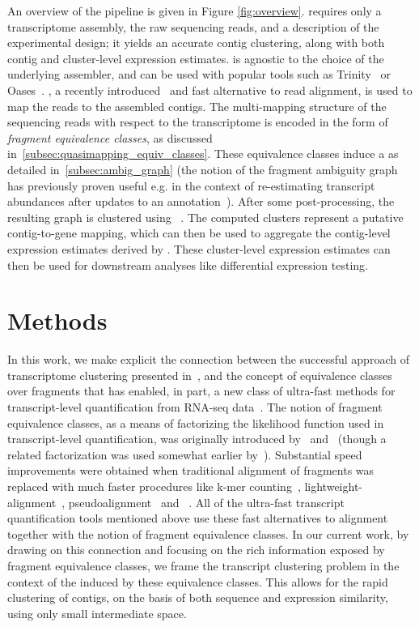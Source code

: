 An overview of the \rapclust pipeline is given in Figure \ref{fig:overview}. \rapclust requires only a transcriptome assembly, the raw sequencing reads, and a description of the experimental design; it yields an accurate contig clustering, along with both contig and cluster-level expression estimates. \rapclust is agnostic to the choice of the underlying \denovo assembler, and can be used with popular tools such as Trinity~\cite{trinity} or Oases~\cite{oases}. \Qm, a recently introduced~\citep{rapmap} and fast alternative to read alignment, is used to map the reads to the assembled contigs. The multi-mapping structure of the sequencing reads with respect to the transcriptome is encoded in the form of {\it fragment equivalence classes}, as discussed in~\ref{subsec:quasimapping_equiv_classes}. These equivalence classes induce a \ambiggraph as detailed in~\ref{subsec:ambig_graph} (the notion of the fragment ambiguity graph has previously proven useful e.g. in the context of re-estimating transcript abundances after updates to an annotation~\citep{reexpress}). After some post-processing, the resulting graph is clustered using \mcl~\citep{mcl}. The computed clusters represent a putative contig-to-gene mapping, which can then be used to aggregate the contig-level expression estimates derived by \sailfish.  These cluster-level expression estimates can then be used for downstream analyses like differential expression testing.


\section{Methods}
\label{sec:methods}

In this work, we make explicit the connection between the successful approach of \denovo transcriptome clustering presented in~\cite{corset}, and the concept of equivalence classes over fragments that has enabled, in part, a new class of ultra-fast methods for transcript-level quantification from RNA-seq data~\cite{sailfish, salmon, kallisto}.  The notion of fragment equivalence classes, as a means of factorizing the likelihood function used in transcript-level quantification, was originally introduced by~\citet{isoem} and~\citet{mmseq} (though a related factorization was used somewhat earlier by~\citet{jiang}). Substantial speed improvements were obtained when traditional alignment of fragments was replaced with much faster procedures like k-mer counting~\citep{sailfish}, lightweight-alignment~\citep{salmon}, pseudoalignment~\citep{kallisto} and \qm~\citep{rapmap}.  All of the ultra-fast transcript quantification tools mentioned above use these fast alternatives to alignment together with the notion of fragment equivalence classes. In our current work, by drawing on this connection and focusing on the rich information exposed by fragment equivalence classes, we frame the transcript clustering problem in the context of the \ambiguitygraph induced by these equivalence classes. This allows for the rapid clustering of contigs, on the basis of both sequence and expression similarity, using only small intermediate space.

